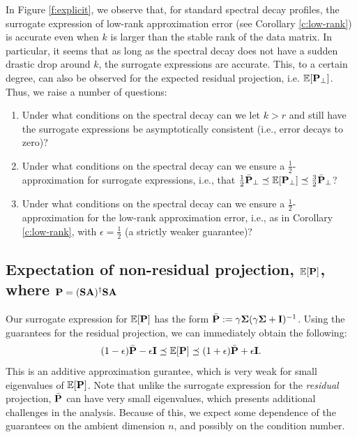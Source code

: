 \documentclass[11pt]{article}
\begin{document}
In Figure \ref{f:explicit}, we observe that, for standard spectral
decay profiles, the surrogate expression
of low-rank approximation error (see Corollary \ref{c:low-rank}) is
accurate even when $k$ is larger than the stable rank of the data
matrix. In particular, it seems that as long as the spectral decay
does not have a sudden drastic drop around $k$, the surrogate
expressions are accurate. This, to a certain degree, can also be
observed for the expected residual projection, i.e. $\E[\P_{\perp}]$.
Thus, we raise a number of questions:
\begin{enumerate}
  \item Under what conditions on the spectral decay can we let $k>r$
    and still have the surrogate expressions be asymptotically
    consistent (i.e., error decays to zero)?
  \item Under what conditions on the spectral decay can we ensure a
    $\frac12$-approximation for surrogate expressions, i.e., that
    $\frac12\bar\P_{\perp}\preceq\E[\P_{\perp}]\preceq\frac32\bar\P_{\perp}$?
  \item Under what conditions on the spectral decay can we ensure a
    $\frac12$-approximation for the low-rank approximation error,
    i.e., as in Corollary \ref{c:low-rank}, with $\epsilon=\frac12$ (a
    strictly weaker guarantee)?
\end{enumerate}

\subsection{Expectation of non-residual projection, $\E[\P]$, where
  $\P=(\S\A)^\dagger\S\A$}\label{s:non-residual}
Our surrogate expression for $\E[\P]$ has the form
$\bar\P:=\gamma\Sigmab(\gamma\Sigmab+\I)^{-1}$. Using the guarantees
for the residual projection, we can immediately obtain the following:
\begin{align*}
(1-\epsilon)\bar\P - \epsilon \I\preceq \E[\P]\preceq (1+\epsilon)\bar\P + \epsilon\I.
\end{align*}
This is an additive approximation gurantee, which is very
weak for small eigenvalues of $\E[\P]$. Note that unlike the surrogate
expression for the \emph{residual} projection, $\bar\P$ can have very small
eigenvalues, which presents additional challenges in the
analysis. Because of this, we expect some dependence of the guarantees
on the ambient dimension $n$, and possibly on the condition number.
\end{document}
